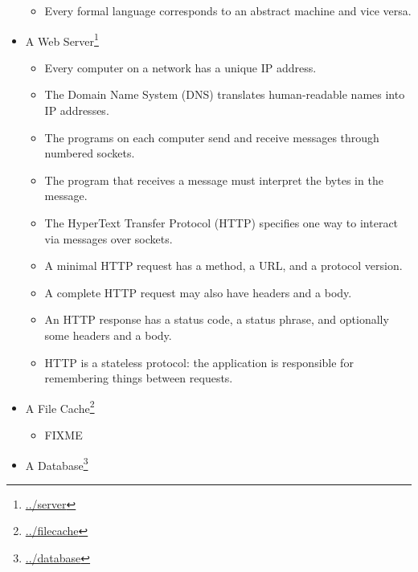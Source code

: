 \documentclass{scrbook}
\newcommand{\hreffoot}[2]{{#1}\footnote{\href{#2}{#2}}}
\begin{document}
\begin{itemize}
\begin{itemize}
\item Every formal language corresponds to an abstract machine and vice versa.

\end{itemize}



\item \hreffoot{A Web Server}{../server}
\begin{itemize}

\item Every computer on a network has a unique IP address.

\item The Domain Name System (DNS) translates human-readable names into IP addresses.

\item The programs on each computer send and receive messages through numbered sockets.

\item The program that receives a message must interpret the bytes in the message.

\item The HyperText Transfer Protocol (HTTP) specifies one way to interact via messages over sockets.

\item A minimal HTTP request has a method, a URL, and a protocol version.

\item A complete HTTP request may also have headers and a body.

\item An HTTP response has a status code, a status phrase, and optionally some headers and a body.

\item HTTP is a stateless protocol: the application is responsible for remembering things between requests.

\end{itemize}



\item \hreffoot{A File Cache}{../filecache}
\begin{itemize}

\item FIXME

\end{itemize}



\item \hreffoot{A Database}{../database}
\begin{itemize}


\end{itemize}
\end{itemize}
\end{document}
